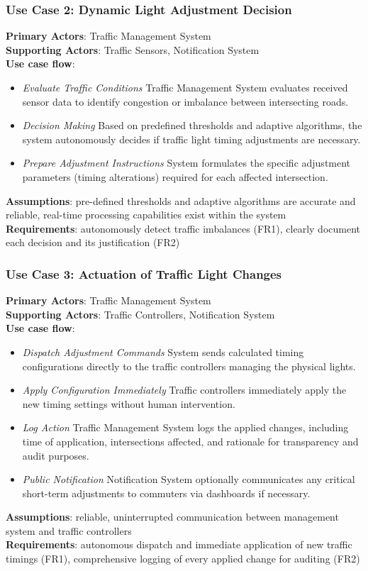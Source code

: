 \documentclass[a4paper,12pt]{article}
\begin{document}
\subsubsection*{Use Case 2: Dynamic Light Adjustment Decision}
\textbf{Primary Actors}: Traffic Management System \\
\textbf{Supporting Actors}: Traffic Sensors, Notification System \\
\textbf{Use case flow}: 
\begin{itemize}
    \item \textit{Evaluate Traffic Conditions} Traffic Management System evaluates received sensor data to identify congestion or imbalance between intersecting roads.
    \item \textit{Decision Making} Based on predefined thresholds and adaptive algorithms, the system autonomously decides if traffic light timing adjustments are necessary.
    \item \textit{Prepare Adjustment Instructions} System formulates the specific adjustment parameters (timing alterations) required for each affected intersection.
\end{itemize}
\textbf{Assumptions}: pre-defined thresholds and adaptive algorithms are accurate and reliable, real-time processing capabilities exist within the system \\
\textbf{Requirements}: autonomously detect traffic imbalances (FR1), clearly document each decision and its justification (FR2) \\

\subsubsection*{Use Case 3: Actuation of Traffic Light Changes}
\textbf{Primary Actors}: Traffic Management System \\
\textbf{Supporting Actors}: Traffic Controllers, Notification System \\
\textbf{Use case flow}: 
\begin{itemize}
    \item \textit{Dispatch Adjustment Commands} System sends calculated timing configurations directly to the traffic controllers managing the physical lights.
    \item \textit{Apply Configuration Immediately} Traffic controllers immediately apply the new timing settings without human intervention.
    \item \textit{Log Action} Traffic Management System logs the applied changes, including time of application, intersections affected, and rationale for transparency and audit purposes.
    \item \textit{Public Notification} Notification System optionally communicates any critical short-term adjustments to commuters via dashboards if necessary.
\end{itemize}
\textbf{Assumptions}: reliable, uninterrupted communication between management system and traffic controllers \\
\textbf{Requirements}: autonomous dispatch and immediate application of new traffic timings (FR1), comprehensive logging of every applied change for auditing (FR2) \\
\end{document}

